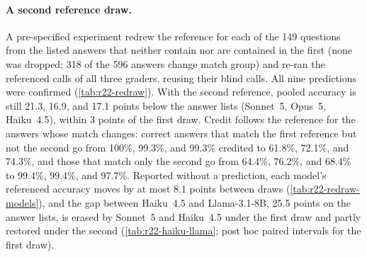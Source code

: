 \paragraph{A second reference draw.}
A pre-specified experiment redrew the reference for each of the 149 questions from the listed answers that neither contain nor are contained in the first (none was dropped; 318 of the 596 answers change match group) and re-ran the referenced calls of all three graders, reusing their blind calls. All nine predictions were confirmed (\cref{tab:r22-redraw}). With the second reference, pooled accuracy is still 21.3, 16.9, and 17.1 points below the answer lists (Sonnet~5, Opus~5, Haiku~4.5), within 3 points of the first draw. Credit follows the reference for the answers whose match changes: correct answers that match the first reference but not the second go from 100\%, 99.3\%, and 99.3\% credited to 61.8\%, 72.1\%, and 74.3\%, and those that match only the second go from 64.4\%, 76.2\%, and 68.4\% to 99.4\%, 99.4\%, and 97.7\%. Reported without a prediction, each model's referenced accuracy moves by at most 8.1 points between draws (\cref{tab:r22-redraw-models}), and the gap between Haiku~4.5 and Llama-3.1-8B, 25.5 points on the answer lists, is erased by Sonnet~5 and Haiku~4.5 under the first draw and partly restored under the second (\cref{tab:r22-haiku-llama}; post hoc paired intervals for the first draw).

\begin{table}[htbp]
\centering
\caption{The benchmark study under a second reference draw: pooled referenced minus answer-list accuracy under each draw and its change (points, 95\% CI, question bootstrap), and the share of correct answers credited (score 7 or above) among those that stop or start matching the reference between draws. Opus~5 uses the 136 questions with both draws complete.\pre}
\label{tab:r22-redraw}
\footnotesize
\setlength{\tabcolsep}{3pt}

\end{table}

\begin{table}[htbp]
\centering
\caption{Per-model accuracy (\%) under the answer list and each reference draw, and the paired change between draws (points, 95\% CI).\pre}
\label{tab:r22-redraw-models}
\footnotesize

\end{table}

\begin{table}[htbp]
\centering
\caption{Haiku~4.5 minus Llama-3.1-8B accuracy (points, paired question bootstrap, 95\% CI) under each grader. The answer-list, blind, and first-draw columns are post hoc (Opus~5: its 141 questions); the second-draw column was a registered readout (Opus~5: the 136 questions with both draws complete).}
\label{tab:r22-haiku-llama}
\footnotesize

\end{table}


